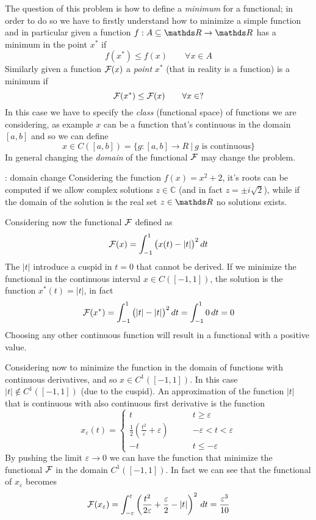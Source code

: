 	The question of this problem is how to define a \textit{minimum} for a functional; in order to do so we have to firstly understand how to minimize a simple function and in particular given a function $f: A\subseteq \R \rightarrow \R$ has a minimum in the point $x^*$ if
	\[  f(x^*) \leq f(x) \qquad \forall x \in A \]
	Similarly given a function $\mathcal{F}(x)$ a \textit{point} $x^*$ (that in reality is a function) is a minimum if 
	\[ \mathcal{F}(x^*) \leq \mathcal{F}(x) \qquad \forall x \in ? \]
	In this case we have to specify the \textit{class} (functional space) of functions we are considering, as example $x$ can be a function that's continuous in the domain $[a,b]$ and so we can define
	\[ x\in C([a,b]) = \big\{ g:[a,b]\rightarrow R \ | \ g \textrm{ is continuous} \big\} \]
	In general changing the \textit{domain} of the functional $\mathcal{F}$ may change the problem.
	\begin{example}{: domain change}
		Considering the function $f(x) = x^2+2$, it's roots can be computed if we allow complex solutions $z\in \mathds C$ (and in fact $z = \pm i \sqrt 2$), while if the domain of the solution is the real set $z\in \R$ no solutions exists. \vspace{3mm}
		
		Considering now the functional $\mathcal{F}$ defined as
		\[ \mathcal{F}(x) = \int_{-1}^1 \big(x(t) - |t|\big)^2\, dt \]
		The $|t|$ introduce a cuspid in $t=0$ that cannot be derived. If we minimize the functional in the continuous interval $x\in C([-1,1])$, the solution is the function $x^*(t) = |t|$, in fact
		\[ \mathcal{F}(x^*) = \int_{-1}^1 \big(|t|-|t|\big)^2 \, dt = \int_{-1}^1 0\, dt = 0 \]
		Choosing any other continuous function will result in a functional with a positive value.
		
		Considering now to minimize the function in the domain of functions with continuous derivatives, and so $x\in C^1([-1,1])$. In this case $|t|\notin C^1([-1,1])$ (due to the cuspid). An approximation of the function $|t|$ that is continuous with also continuous first derivative is the function
		\[ x_\varepsilon(t) = \begin{cases}
			t \qquad & t \geq \varepsilon \\
			\frac 1 2 \left(\frac{t^2}\varepsilon + \varepsilon\right) \qquad & -\varepsilon < t< \varepsilon \\
			-t & t \leq- \varepsilon
		\end{cases} \]
		By pushing the limit $\varepsilon\rightarrow 0$ we can have the function that minimize the functional $\mathcal{F}$ in the domain $C^1([-1,1])$. In fact we can see that the functional of $x_\varepsilon$ becomes
		\[ \mathcal{F}(x_\varepsilon) = \int_{-\varepsilon}^\varepsilon \left( \frac{t^2}{2\varepsilon} + \frac \varepsilon 2 - |t| \right)^2\, dt = \frac{\varepsilon^3}{10} \]
		
	\end{example}

